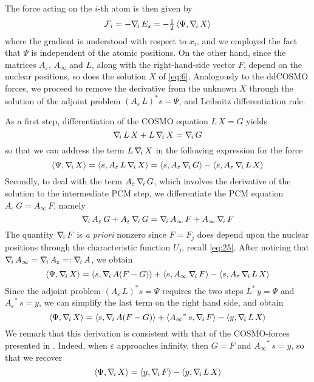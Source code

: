 The force acting on the $i$-th atom is then given by
\[
\mathcal{F}_i = -\nabla_{\!i}\, E_s = - \tfrac{1}{2} 
\,  \langle \Psi, \nabla_{\!i}\, X \rangle 
\]
where the gradient is understood with respect to $x_i$, and we employed the fact that $\Psi$ is independent of the atomic positions. On the other hand, since the matrices $A_\varepsilon$, $A_\infty$ and $L$, along with the right-hand-side vector $F$, depend on the nuclear positions, so does the solution $X$ of \eqref{eq:6}. Analogously to the ddCOSMO forces, we proceed to remove the derivative from the unknown $X$ through the solution of the adjoint problem $(A_\varepsilon \, L)^* s = \Psi$, and Leibnitz differentiation rule.

As a first step, differentiation of the COSMO equation $L\, X = G$ yields
\[
\nabla_{\!i}\, L \, X + L \, \nabla_{\!i}\, X = \nabla_{\!i}\, G
\]
so that we can address the term $L \, \nabla_{\!i}\, X$ in the following expression for the force
\[
\langle \Psi , \nabla_{\!i}\, X\rangle  = \langle s ,  A_\varepsilon \, L \, \nabla_{\!i}\, X\rangle
 = \langle s ,  A_\varepsilon \, \nabla_{\!i}\, G \rangle - \langle s , A_\varepsilon \, \nabla_{\!i}\, L \,  X \rangle
\]
Secondly, to deal with the term $A_\varepsilon \, \nabla_{\!i}\, G$, which involves the derivative of the solution to the intermediate PCM step, we differentiate the PCM equation $A_\varepsilon \, G = A_\infty \, F$, namely
\[
\nabla_{\!i}\, A_\varepsilon \, G + A_\varepsilon \, \nabla_{\!i}\, G = \nabla_{\!i}\, A_\infty \, F + A_\infty \, \nabla_{\!i}\, F
\]
The quantity $\nabla_{\!i}\, F$ is \emph{a priori} nonzero since $F = F_j$ does depend upon the nuclear positions through the characteristic function $U_j$, recall \eqref{eq:25}. After noticing that $\nabla_{\!i}\, A_\infty=\nabla_{\!i}\, A_\varepsilon =: \nabla_{\!i}\, A$, we obtain
\[
\langle \Psi , \nabla_{\!i}\, X\rangle = \langle s , \nabla_{\!i}\,  A ( F - G ) \rangle + \langle  s ,{A_\infty}\, \nabla_{\!i}\, F \rangle - \langle  s , {A_\varepsilon}\, \nabla_{\!i}\, L \,  X \rangle
\]
Since the adjoint problem $(A_\varepsilon \, L )^* s = \Psi$ requires the two steps ${L}^* \, y = \Psi$ and ${A_\varepsilon}^* \, s = y$, we can simplify the last term on the right hand side, and obtain
\[
\langle \Psi , \nabla_{\!i}\, X\rangle = \langle s , \nabla_{\!i}\,  A ( F - G ) \rangle + \langle {A_\infty}^*\, s , \nabla_{\!i}\, F \rangle - \langle  y , \nabla_{\!i}\, L \,  X \rangle
\]
We remark that this derivation is consistent with that of the COSMO-forces presented in \cite{Lipparini_JCTC_ddCOSMO}. Indeed, when $\varepsilon$ approaches infinity, then $G = F$ and ${A_\infty}^* \, s =y$, so that we recover
\[
\langle \Psi , \nabla_{\!i}\, X\rangle =  \langle y , \nabla_{\!i}\, F \rangle - \langle y , \nabla_{\!i}\, L \,  X \rangle
\]
